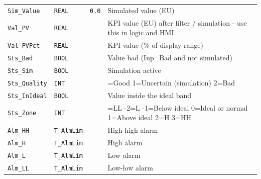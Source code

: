 {\begin{longtable}{@{}>{\raggedright\arraybackslash}p{3.4cm}>{\raggedright\arraybackslash}p{3.3cm}>{\raggedright\arraybackslash}p{1.3cm}>{\raggedright\arraybackslash}p{6.4cm}@{}}
\texttt{Sim\_Value} & \texttt{REAL} & \texttt{0.0} & Simulated value (EU) \\
\texttt{Val\_PV} & \texttt{REAL} &  & KPI value (EU) after filter /\allowbreak{} simulation - use this in logic and HMI \\
\texttt{Val\_PVPct} & \texttt{REAL} &  & KPI value (\% of display range) \\
\texttt{Sts\_Bad} & \texttt{BOOL} &  & Value bad (Inp\_Bad and not simulated) \\
\texttt{Sts\_Sim} & \texttt{BOOL} &  & Simulation active \\
\texttt{Sts\_Quality} & \texttt{INT} &  & 0=Good 1=Uncertain (simulation) 2=Bad \\
\texttt{Sts\_InIdeal} & \texttt{BOOL} &  & Value inside the ideal band \\
\texttt{Sts\_Zone} & \texttt{INT} &  & -3=LL -2=L -1=Below ideal 0=Ideal or normal 1=Above ideal 2=H 3=HH \\
\texttt{Alm\_HH} & \texttt{T\_AlmLim} &  & High-high alarm \\
\texttt{Alm\_H} & \texttt{T\_AlmLim} &  & High alarm \\
\texttt{Alm\_L} & \texttt{T\_AlmLim} &  & Low alarm \\
\texttt{Alm\_LL} & \texttt{T\_AlmLim} &  & Low-low alarm \\
\bottomrule
\end{longtable}
}
